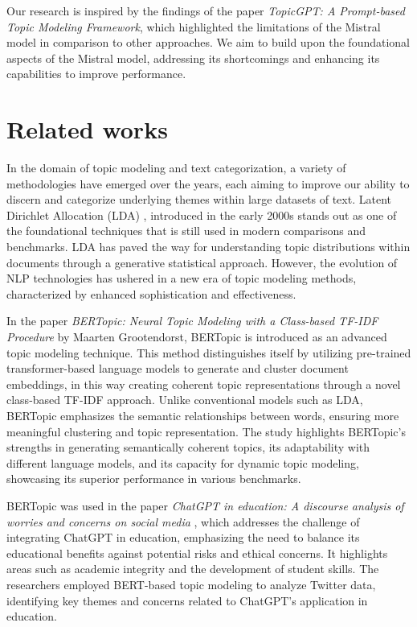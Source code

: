 \documentclass[fleqn,moreauthors,10pt]{ds_report}
\begin{document}
Our research is inspired by the findings of the paper \textit{TopicGPT: A Prompt-based Topic Modeling Framework}, which highlighted the limitations of the Mistral model in comparison to other approaches. We aim to build upon the foundational aspects of the Mistral model, addressing its shortcomings and enhancing its capabilities to improve performance.
\fi

\section*{Related works}

\iffalse
In the domain of topic modeling and text categorization, a variety of methodologies have emerged over the years, each aiming to improve our ability to discern and categorize underlying themes within large datasets of text. Latent Dirichlet Allocation (LDA) \cite{Blei2003LatentDA}, introduced in the early 2000s stands out as one of the foundational techniques that is still used in modern comparisons and benchmarks. LDA has paved the way for understanding topic distributions within documents through a generative statistical approach. However, the evolution of NLP technologies has ushered in a new era of topic modeling methods, characterized by enhanced sophistication and effectiveness. 

In the paper \textit{BERTopic: Neural Topic Modeling with a Class-based TF-IDF Procedure} by Maarten Grootendorst, BERTopic is introduced as an advanced topic modeling technique. This method distinguishes itself by utilizing pre-trained transformer-based language models to generate and cluster document embeddings, in this way creating coherent topic representations through a novel class-based TF-IDF approach. Unlike conventional models such as LDA, BERTopic emphasizes the semantic relationships between words, ensuring more meaningful clustering and topic representation. The study highlights BERTopic's strengths in generating semantically coherent topics, its adaptability with different language models, and its capacity for dynamic topic modeling, showcasing its superior performance in various benchmarks. 

BERTopic was used in the paper \textit{ChatGPT in education: A discourse analysis of worries and
concerns on social media} \cite{li2023chatgpt}, which addresses the challenge of integrating ChatGPT in education, emphasizing the need to balance its educational benefits against potential risks and ethical concerns.  It highlights areas such as academic integrity and the development of student skills. The researchers employed BERT-based topic modeling to analyze Twitter data, identifying key themes and concerns related to ChatGPT's application in education. 
\end{document}
